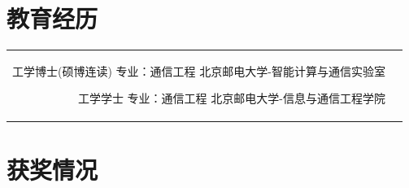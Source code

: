 \documentclass[10pt]{article} %
\begin{document}
\begin{paracol}{2}
	
	\section{教育经历} 
	
	
	
	
	
	\begin{supertabular}{rl} %
		
		
		{工学博士(硕博连读)} %
		{专业：通信工程} %
		{} %
		{北京邮电大学-智能计算与通信实验室} %
		
		
		{工学学士} %
		{专业：通信工程} %
		{} %
		{北京邮电大学-信息与通信工程学院} %
		
	\end{supertabular}
	
	\medskip %
		
	
	\section{获奖情况}
	
	

\end{paracol}
\end{document}
